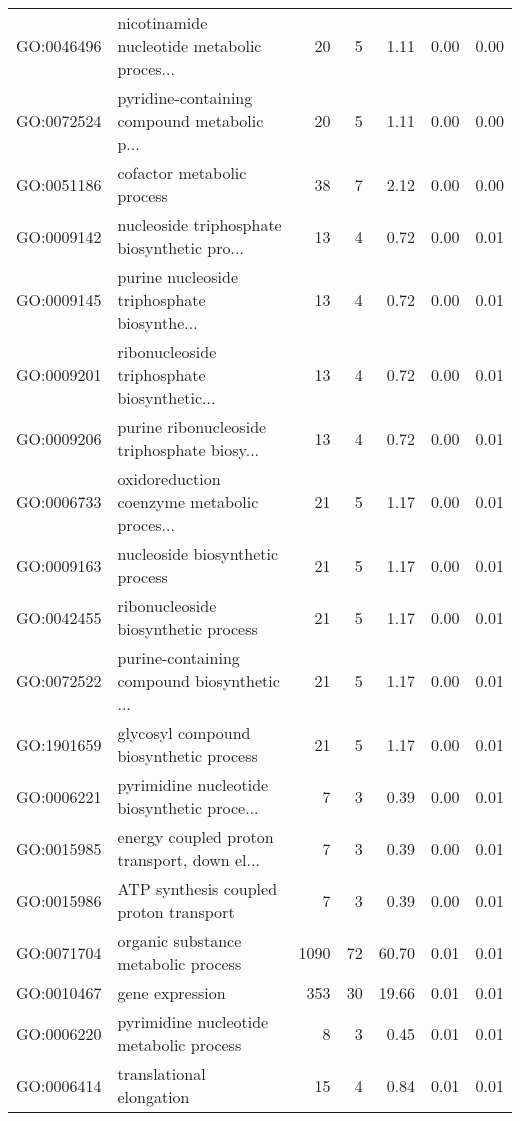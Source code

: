 \begin{table}[ht]
\begin{tabular}{llrrrrr}
  GO:0046496 & nicotinamide nucleotide metabolic proces... &  20 &   5 & 1.11 & 0.00 & 0.00 \\ 
  GO:0072524 & pyridine-containing compound metabolic p... &  20 &   5 & 1.11 & 0.00 & 0.00 \\ 
  GO:0051186 & cofactor metabolic process &  38 &   7 & 2.12 & 0.00 & 0.00 \\ 
  GO:0009142 & nucleoside triphosphate biosynthetic pro... &  13 &   4 & 0.72 & 0.00 & 0.01 \\ 
  GO:0009145 & purine nucleoside triphosphate biosynthe... &  13 &   4 & 0.72 & 0.00 & 0.01 \\ 
  GO:0009201 & ribonucleoside triphosphate biosynthetic... &  13 &   4 & 0.72 & 0.00 & 0.01 \\ 
  GO:0009206 & purine ribonucleoside triphosphate biosy... &  13 &   4 & 0.72 & 0.00 & 0.01 \\ 
  GO:0006733 & oxidoreduction coenzyme metabolic proces... &  21 &   5 & 1.17 & 0.00 & 0.01 \\ 
  GO:0009163 & nucleoside biosynthetic process &  21 &   5 & 1.17 & 0.00 & 0.01 \\ 
  GO:0042455 & ribonucleoside biosynthetic process &  21 &   5 & 1.17 & 0.00 & 0.01 \\ 
  GO:0072522 & purine-containing compound biosynthetic ... &  21 &   5 & 1.17 & 0.00 & 0.01 \\ 
  GO:1901659 & glycosyl compound biosynthetic process &  21 &   5 & 1.17 & 0.00 & 0.01 \\ 
  GO:0006221 & pyrimidine nucleotide biosynthetic proce... &   7 &   3 & 0.39 & 0.00 & 0.01 \\ 
  GO:0015985 & energy coupled proton transport, down el... &   7 &   3 & 0.39 & 0.00 & 0.01 \\ 
  GO:0015986 & ATP synthesis coupled proton transport &   7 &   3 & 0.39 & 0.00 & 0.01 \\ 
  GO:0071704 & organic substance metabolic process & 1090 &  72 & 60.70 & 0.01 & 0.01 \\ 
  GO:0010467 & gene expression & 353 &  30 & 19.66 & 0.01 & 0.01 \\ 
  GO:0006220 & pyrimidine nucleotide metabolic process &   8 &   3 & 0.45 & 0.01 & 0.01 \\ 
  GO:0006414 & translational elongation &  15 &   4 & 0.84 & 0.01 & 0.01 \\ 
   \hline
\end{tabular}
\end{table}
